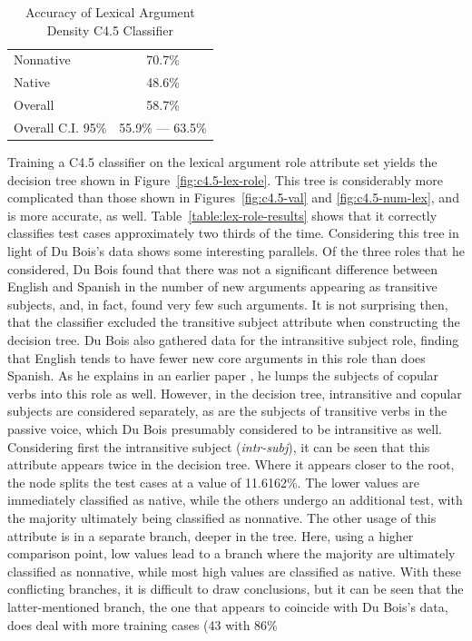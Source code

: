 \documentclass[main.tex]{subfiles}
\begin{document}
\begin{table}[ht]
\centering
\caption{Accuracy of Lexical Argument Density C4.5 Classifier}
\begin{tabular}{l c}
\toprule
Nonnative & 70.7\% \\
Native & 48.6\% \\
Overall & 58.7\% \\
Overall C.I. 95\% & 55.9\% --- 63.5\%\\
\bottomrule
\end{tabular}
\label{table:num-lex-results}
\end{table}

Training a C4.5 classifier on the lexical argument role attribute set yields the decision tree shown in Figure~\ref{fig:c4.5-lex-role}. This tree is considerably more complicated than those shown in Figures~\ref{fig:c4.5-val} and \ref{fig:c4.5-num-lex}, and is more accurate, as well. Table~\ref{table:lex-role-results} shows that it correctly classifies test cases approximately two thirds of the time. Considering this tree in light of Du Bois's data shows some interesting parallels. Of the three roles that he considered, Du Bois found that there was not a significant difference between English and Spanish in the number of new arguments appearing as transitive subjects, and, in fact, found very few such arguments. It is not surprising then, that the classifier excluded the transitive subject attribute when constructing the decision tree. Du Bois also gathered data for the intransitive subject role, finding that English tends to have fewer new core arguments in this role than does Spanish. As he explains in an earlier paper \citep{dubois:1987}, he lumps the subjects of copular verbs into this role as well. However, in the decision tree, intransitive and copular subjects are considered separately, as are the subjects of transitive verbs in the passive voice, which Du Bois presumably considered to be intransitive as well. Considering first the intransitive subject (\textit{intr-subj}), it can be seen that this attribute appears twice in the decision tree. Where it appears closer to the root, the node splits the test cases at a value of 11.6162\%. The lower values are immediately classified as native, while the others undergo an additional test, with the majority ultimately being classified as nonnative. The other usage of this attribute is in a separate branch, deeper in the tree. Here, using a higher comparison point, low values lead to a branch where the majority are ultimately classified as nonnative, while most high values are classified as native. With these conflicting branches, it is difficult to draw conclusions, but it can be seen that the latter-mentioned branch, the one that appears to coincide with Du Bois's data, does deal with more training cases (43 with 86\% 
\end{document}
